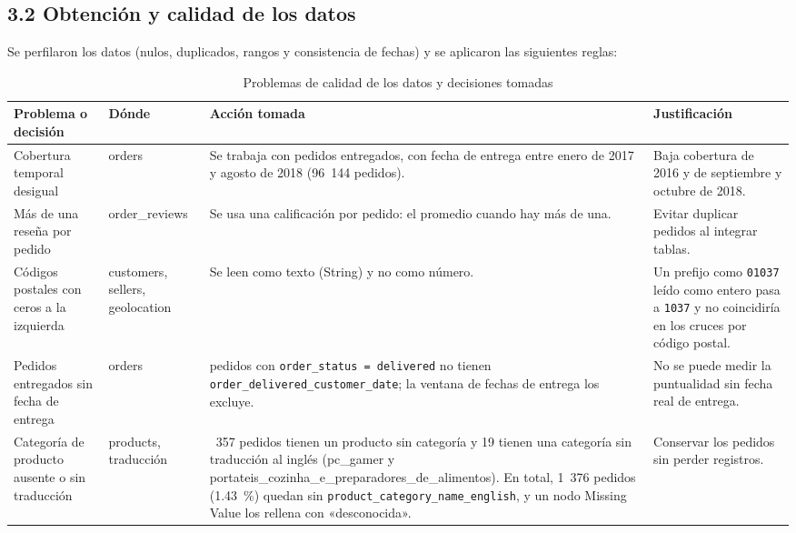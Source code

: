 \documentclass[a4paper,stu,12pt,donotrepeattitle,floatsintext]{apa7}
\begin{document}
\subsection{3.2 Obtención y calidad de los datos}
Se perfilaron los datos (nulos, duplicados, rangos y consistencia de fechas) y se aplicaron las siguientes reglas:

{\footnotesize
\begin{longtable}{|>{\raggedright\arraybackslash}p{}|>{\raggedright\arraybackslash}p{}|>{\raggedright\arraybackslash}p{}|>{\raggedright\arraybackslash}p{}|}
\caption{Problemas de calidad de los datos y decisiones tomadas}\\
\hline
\textbf{Problema o decisión} & \textbf{Dónde} & \textbf{Acción tomada} & \textbf{Justificación} \\ \hline
\endhead
Cobertura temporal desigual & orders & Se trabaja con pedidos entregados, con fecha de entrega entre enero de 2017 y agosto de 2018 (96~144 pedidos). & Baja cobertura de 2016 y de septiembre y octubre de 2018. \\ \hline
Más de una reseña por pedido & order\_\allowbreak{}reviews & Se usa una calificación por pedido: el promedio cuando hay más de una. & Evitar duplicar pedidos al integrar tablas. \\ \hline
Códigos postales con ceros a la izquierda & customers, sellers, geolocation & Se leen como texto (String) y no como número. & Un prefijo como \texttt{01037} leído como entero pasa a \texttt{1037} y no coincidiría en los cruces por código postal. \\ \hline
Pedidos entregados sin fecha de entrega & orders & 8 pedidos con \texttt{order\_\allowbreak{}status = delivered} no tienen \texttt{order\_\allowbreak{}delivered\_\allowbreak{}customer\_\allowbreak{}date}; la ventana de fechas de entrega los excluye. & No se puede medir la puntualidad sin fecha real de entrega. \\ \hline
Categoría de producto ausente o sin traducción & products, traducción & 1~357 pedidos tienen un producto sin categoría y 19 tienen una categoría sin traducción al inglés (pc\_\allowbreak{}gamer y portateis\_\allowbreak{}cozinha\_\allowbreak{}e\_\allowbreak{}preparadores\_\allowbreak{}de\_\allowbreak{}alimentos). En total, 1~376 pedidos (1.43~\%) quedan sin \texttt{product\_\allowbreak{}category\_\allowbreak{}name\_\allowbreak{}english}, y un nodo Missing Value los rellena con «desconocida». & Conservar los pedidos sin perder registros. \\ \hline

\end{longtable}}
\end{document}
